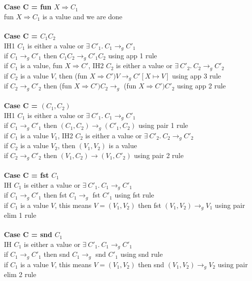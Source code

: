 \documentclass{article}
\begin{document}
\\ \\
\textbf{Case C = fun $X \Rightarrow C_1$ } \\
fun $X \Rightarrow C_1$ is a value and we are done 
\\ \\
\textbf{Case C = $C_1 C_2$} \\
IH1 $C_1$ is either a value or $  \exists \ C'_1.\ C_1 \to_g C'_1 $ \\
if $C_1 \to_g C'_1$ then $C_1 C_2 \to_g C'_1 C_2$ using app 1 rule\\
if $C_1$ is a value, fun $X \Rightarrow C'$, IH2 $C_2$ is either a value or $  \exists \ C'_2.\ C_2 \to_g C'_2 $ \\
if $C_2$ is a value $V$, then (fun $X \Rightarrow C') V \to_g C'[X \mapsto V]$ using app 3 rule \\
if $C_2 \to_g C'_2$ then (fun $X \Rightarrow C') C_2 \to_g$ (fun $X \Rightarrow C') C'_2$ using app 2 rule 
\\ \\
\textbf{Case C = $(C_1,C_2)$} \\
IH1 $C_1$ is either a value or $  \exists \ C'_1.\ C_1 \to_g C'_1 $ \\
if $C_1 \to_g C'_1$ then $(C_1,C_2) \to_g (C'_1, C_2)$ using pair 1 rule\\
if $C_1$ is a value $V_1$, IH2 $C_2$ is either a value or $  \exists \ C'_2.\ C_2 \to_g C'_2 $ \\
if $C_2$ is a value $V_2$, then $(V_1,V_2)$ is a value \\
if $C_2 \to_g C'_2$ then $(V_1,C_2) \to (V_1,C'_2)$ using pair 2 rule \\ \\
\textbf{Case C = fst $C_1$} \\
IH $C_1$ is either a value or $  \exists \ C'_1.\ C_1 \to_g C'_1 $ \\
if $C_1 \to_g C'_1$ then fst $C_1 \to_g$ fst $C'_1$ using fst rule\\
if $C_1$ is a value $V$, this means $V = (V_1, V_2)$ then fst $(V_1, V_2) \to_g V_1$ using pair elim 1 rule\\ \\
\textbf{Case C = snd $C_1$} \\
IH $C_1$ is either a value or $  \exists \ C'_1.\ C_1 \to_g C'_1 $ \\
if $C_1 \to_g C'_1$ then snd $C_1 \to_g$ snd $C'_1$ using snd rule\\
if $C_1$ is a value $V$, this means $V = (V_1, V_2)$ then snd $(V_1, V_2) \to_g V_2$ using pair elim 2 rule\\ \\
\end{document}
